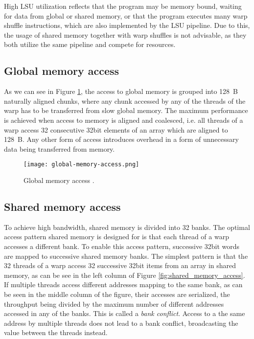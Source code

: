 High LSU utilization reflects that the program may be memory bound, waiting for data from global or shared memory, or that the program executes many warp shuffle instructions, which are also implemented by the LSU pipeline. Due to this, the usage of shared memory together with warp shuffles is not advisable, as they both utilize the same pipeline and compete for resources.


\subsection{Global memory access}

As we can see in Figure \ref{fig:global_memory_access}, the access to global memory is grouped into 128~B naturally aligned chunks, where any chunk accessed by any of the threads of the warp has to be transferred from slow global memory. The maximum performance is achieved when access to memory is aligned and coalesced, i.e. all threads of a warp access 32 consecutive 32bit elements of an array which are aligned to 128~B. Any other form of access introduces overhead in a form of unnecessary data being transferred from memory. 

\begin{figure}[h]
	\centering
	\texttt{[image: global-memory-access.png]}
	\caption{Global memory access \citep{site:cuda}.}
	\label{fig:global_memory_access}
\end{figure}

\subsection{Shared memory access}
To achieve high bandwidth, shared memory is divided into 32 banks. The optimal access pattern shared memory is designed for is that each thread of a warp accesses a different bank. To enable this access pattern, successive 32bit words are mapped to successive shared memory banks. The simplest pattern is that the 32 threads of a warp access 32 successive 32bit items from an array in shared memory, as can be see in the left column of Figure \ref{fig:shared_memory_access}. If multiple threads access different addresses mapping to the same bank, as can be seen in the middle column of the figure, their accesses are serialized, the throughput being divided by the maximum number of different addresses accessed in any of the banks. This is called a \textit{bank conflict}. Access to a the same address by multiple threads does not lead to a bank conflict, broadcasting the value between the threads instead.

